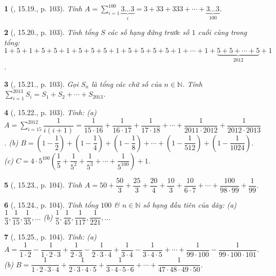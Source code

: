\documentclass{article}
\newtheorem{baitoan}{}
\begin{document}
\begin{baitoan}[\cite{TLCT_THCS_Toan_6_so_hoc}, 15.19., p. 103]
	Tính $A = \sum_{i=1}^{100} \underbrace{3\ldots3}_i = 3 + 33 + 333 + \cdots + \underbrace{3\ldots3}_{100}$.
\end{baitoan}

\begin{baitoan}[\cite{TLCT_THCS_Toan_6_so_hoc}, 15.20., p. 103]
	Tính tổng $S$ các số hạng đứng trước số $1$ cuối cùng trong tổng: $1 + 5 + 1 + 5 + 5 + 1 + 5 + 5 + 5 + 1 + 5 + 5 + 5 + 5 + 1 + \cdots + 1 + \underbrace{5 + 5 + \cdots + 5}_{2012} + 1$.
\end{baitoan}

\begin{baitoan}[\cite{TLCT_THCS_Toan_6_so_hoc}, 15.21., p. 103]
	Gọi $S_n$ là tổng các chữ số của $n\in\mathbb{N}$. Tính $\sum_{i=1}^{2013} S_i = S_1 + S_2 + \cdots + S_{2013}$.
\end{baitoan}

\begin{baitoan}[\cite{TLCT_THCS_Toan_6_so_hoc}, 15.22., p. 103]
	Tính: (a) $A = \sum_{i=15}^{2012} \dfrac{1}{i(i + 1)} = \dfrac{1}{15\cdot16} + \dfrac{1}{16\cdot17} + \dfrac{1}{17\cdot18} + \cdots + \dfrac{1}{2011\cdot2012} + \dfrac{1}{2012\cdot2013}$. (b) $B = \left(1 - \dfrac{1}{2}\right) + \left(1 - \dfrac{1}{4}\right) + \left(1 - \dfrac{1}{8}\right) + \cdots + \left(1 - \dfrac{1}{512}\right) + \left(1 - \dfrac{1}{1024}\right)$. (c) $C = 4\cdot5^{100}\left(\dfrac{1}{5} + \dfrac{1}{5^2} + \dfrac{1}{5^3} + \cdots + \dfrac{1}{5^{100}}\right) + 1$.
\end{baitoan}

\begin{baitoan}[\cite{TLCT_THCS_Toan_6_so_hoc}, 15.23., p. 104]
	Tính $A = 50 + \dfrac{50}{3} + \dfrac{25}{3} + \dfrac{20}{4} + \dfrac{10}{3} + \dfrac{10}{6\cdot7} + \cdots + \dfrac{100}{98\cdot99} + \dfrac{1}{99}$.
\end{baitoan}

\begin{baitoan}[\cite{TLCT_THCS_Toan_6_so_hoc}, 15.24., p. 104]
	Tính tổng $100$ \& $n\in\mathbb{N}$ số hạng đầu tiên của dãy: (a) $\dfrac{1}{3},\dfrac{1}{15},\dfrac{1}{35},\ldots$ (b) $\dfrac{1}{5},\dfrac{1}{45},\dfrac{1}{117},\dfrac{1}{221},\ldots$
\end{baitoan}

\begin{baitoan}[\cite{TLCT_THCS_Toan_6_so_hoc}, 15.25., p. 104]
	Tính: (a) $A = \dfrac{1}{1\cdot2} - \dfrac{1}{1\cdot2\cdot3} + \dfrac{1}{2\cdot3} - \dfrac{1}{2\cdot3\cdot4} + \dfrac{1}{3\cdot4} - \dfrac{1}{3\cdot4\cdot5} + \cdots + \dfrac{1}{99\cdot100} - \dfrac{1}{99\cdot100\cdot101}$. (b) $B = \dfrac{1}{1\cdot2\cdot3\cdot4} + \dfrac{1}{2\cdot3\cdot4\cdot5} + \dfrac{1}{3\cdot4\cdot5\cdot6} + \cdots + \dfrac{1}{47\cdot48\cdot49\cdot50}$.
\end{baitoan}
\end{document}
